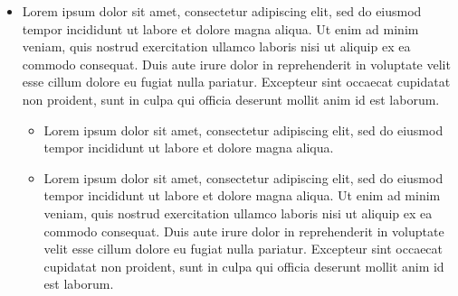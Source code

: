 \begin{itemize}
	\item
	    Lorem ipsum dolor sit amet, consectetur adipiscing elit, sed do eiusmod tempor incididunt ut labore et dolore magna aliqua.
	    Ut enim ad minim veniam, quis nostrud exercitation ullamco laboris nisi ut aliquip ex ea commodo consequat.
	    Duis aute irure dolor in reprehenderit in voluptate velit esse cillum dolore eu fugiat nulla pariatur.
	    Excepteur sint occaecat cupidatat non proident, sunt in culpa qui officia deserunt mollit anim id est laborum.
	    \begin{itemize}
		    \item
		        Lorem ipsum dolor sit amet, consectetur adipiscing elit, sed do eiusmod tempor incididunt ut labore et dolore magna aliqua.
		    \item
		        Lorem ipsum dolor sit amet, consectetur adipiscing elit, sed do eiusmod tempor incididunt ut labore et dolore magna aliqua.
		        Ut enim ad minim veniam, quis nostrud exercitation ullamco laboris nisi ut aliquip ex ea commodo consequat.
		        Duis aute irure dolor in reprehenderit in voluptate velit esse cillum dolore eu fugiat nulla pariatur.
		        Excepteur sint occaecat cupidatat non proident, sunt in culpa qui officia deserunt mollit anim id est laborum.
	    \end{itemize}
\end{itemize}
